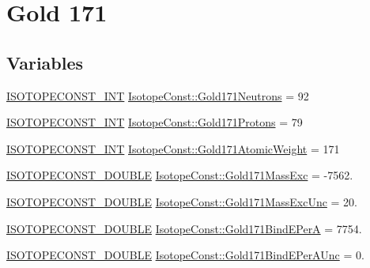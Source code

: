 \hypertarget{group___isotope_const-_gold-_au171}{}\section{Gold 171}
\label{group___isotope_const-_gold-_au171}
\subsection*{Variables}
\begin{DoxyCompactItemize}
\item 
\mbox{\hyperlink{group___isotope_const-_macros_ga5f18360b3e99483a35c32d789e62621c}{I\+S\+O\+T\+O\+P\+E\+C\+O\+N\+S\+T\+\_\+\+I\+NT}} \mbox{\hyperlink{group___isotope_const-_gold-_au171_ga284741b59cc540b504a1e1465d68997f}{Isotope\+Const\+::\+Gold171\+Neutrons}} = 92
\item 
\mbox{\hyperlink{group___isotope_const-_macros_ga5f18360b3e99483a35c32d789e62621c}{I\+S\+O\+T\+O\+P\+E\+C\+O\+N\+S\+T\+\_\+\+I\+NT}} \mbox{\hyperlink{group___isotope_const-_gold-_au171_ga00e03e91fe74398e35e7deb11ec04432}{Isotope\+Const\+::\+Gold171\+Protons}} = 79
\item 
\mbox{\hyperlink{group___isotope_const-_macros_ga5f18360b3e99483a35c32d789e62621c}{I\+S\+O\+T\+O\+P\+E\+C\+O\+N\+S\+T\+\_\+\+I\+NT}} \mbox{\hyperlink{group___isotope_const-_gold-_au171_ga8cdd910a16dc07da5e0b66f2a47b4702}{Isotope\+Const\+::\+Gold171\+Atomic\+Weight}} = 171
\item 
\mbox{\hyperlink{group___isotope_const-_macros_ga8f45a7272ce02c0b4c65c44636ed719a}{I\+S\+O\+T\+O\+P\+E\+C\+O\+N\+S\+T\+\_\+\+D\+O\+U\+B\+LE}} \mbox{\hyperlink{group___isotope_const-_gold-_au171_ga5d1c050867e5a995c51c70793babba0f}{Isotope\+Const\+::\+Gold171\+Mass\+Exc}} = -\/7562.
\item 
\mbox{\hyperlink{group___isotope_const-_macros_ga8f45a7272ce02c0b4c65c44636ed719a}{I\+S\+O\+T\+O\+P\+E\+C\+O\+N\+S\+T\+\_\+\+D\+O\+U\+B\+LE}} \mbox{\hyperlink{group___isotope_const-_gold-_au171_gabc318e8b509b10ffaa8b721fb0b26cc4}{Isotope\+Const\+::\+Gold171\+Mass\+Exc\+Unc}} = 20.
\item 
\mbox{\hyperlink{group___isotope_const-_macros_ga8f45a7272ce02c0b4c65c44636ed719a}{I\+S\+O\+T\+O\+P\+E\+C\+O\+N\+S\+T\+\_\+\+D\+O\+U\+B\+LE}} \mbox{\hyperlink{group___isotope_const-_gold-_au171_ga2990b7293b9d0efc694bdd88f2a6767f}{Isotope\+Const\+::\+Gold171\+Bind\+E\+PerA}} = 7754.
\item 
\mbox{\hyperlink{group___isotope_const-_macros_ga8f45a7272ce02c0b4c65c44636ed719a}{I\+S\+O\+T\+O\+P\+E\+C\+O\+N\+S\+T\+\_\+\+D\+O\+U\+B\+LE}} \mbox{\hyperlink{group___isotope_const-_gold-_au171_ga16caaabc1c123f94f90929321789d07c}{Isotope\+Const\+::\+Gold171\+Bind\+E\+Per\+A\+Unc}} = 0.

\end{DoxyCompactItemize}
